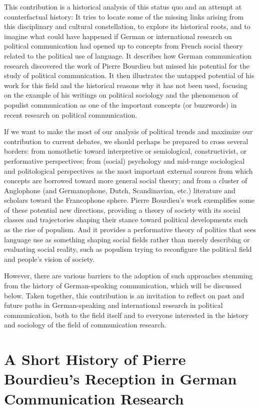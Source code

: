 \documentclass{tufte-handout}
\begin{document}
This contribution is a historical analysis of this status quo and an
attempt at counterfactual history: It tries to locate some of the
missing links arising from this disciplinary and cultural constellation,
to explore its historical roots, and to imagine what could have happened
if German or international research on political communication had
opened up to concepts from French social theory related to the political
use of language. It describes how German communication research
discovered the work of Pierre Bourdieu but missed his potential for the
study of political communication. It then illustrates the untapped
potential of his work for this field and the historical reasons why it
has not been used, focusing on the example of his writings on political
sociology and the phenomenon of populist communication as one of the
important concepts (or buzzwords) in recent research on political
communication.

If we want to make the most of our analysis of political trends and
maximize our contribution to current debates, we should perhaps be
prepared to cross several borders: from nomothetic toward interpretive
or semiological, constructivist, or performative perspectives; from
(social) psychology and mid-range sociological and politological
perspectives as the most important external sources from which concepts
are borrowed toward more general social theory; and from a cluster of
Anglophone (and Germanophone, Dutch, Scandinavian, etc.) literature and
scholars toward the Francophone sphere. Pierre Bourdieu's work
exemplifies some of these potential new directions, providing a theory
of society with its social classes and trajectories shaping their stance
toward political developments such as the rise of populism. And it
provides a performative theory of politics that sees language use as
something shaping social fields rather than merely describing or
evaluating social reality, such as populism trying to reconfigure the
political field and people's vision of society.

However, there are various barriers to the adoption of such approaches
stemming from the history of German-speaking communication, which will
be discussed below. Taken together, this contribution is an invitation
to reflect on past and future paths in German-speaking and international
research in political communication, both to the field itself and to
everyone interested in the history and sociology of the field of
communication research.

\hypertarget{a-short-history-of-pierre-bourdieus-reception-in-german-communication-research}{%
\section{A Short History of Pierre Bourdieu's Reception in German\\\noindent Communication
Research}\label{a-short-history-of-pierre-bourdieus-reception-in-german-communication-research}}
\end{document}
